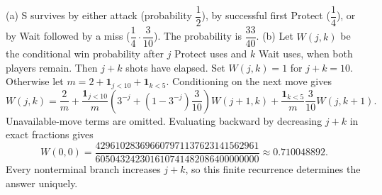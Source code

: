 (a) S survives by either attack (probability $\dfrac{1}{2}$), by successful first Protect ($\dfrac{1}{4}$), or by Wait followed by a miss ($\dfrac{1}{4}\cdot\dfrac{3}{10}$). The probability is $\boxed{\dfrac{33}{40}}$.
(b) Let $W(j,k)$ be the conditional win probability after $j$ Protect uses and $k$ Wait uses, when both players remain. Then $j+k$ shots have elapsed. Set $W(j,k)=1$ for $j+k=10$. Otherwise let $m=2+\mathbf1_{j<10}+\mathbf1_{k<5}$. Conditioning on the next move gives
\[W(j,k)=\dfrac{2}{m}+\dfrac{\mathbf1_{j<10}}{m}\left(3^{-j}+(1-3^{-j})\dfrac{3}{10}\right)W(j+1,k)+\dfrac{\mathbf1_{k<5}}{m}\dfrac{3}{10}W(j,k+1).\]
Unavailable-move terms are omitted. Evaluating backward by decreasing $j+k$ in exact fractions gives
\[\boxed{W(0,0)=\dfrac{429610283696607971137623141562961}{605043242301610741482086400000000}\approx0.710048892}.\]
Every nonterminal branch increases $j+k$, so this finite recurrence determines the answer uniquely.
